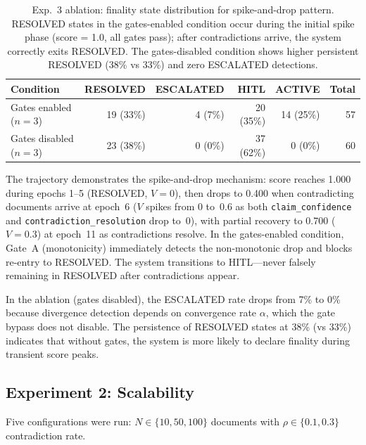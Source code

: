 \documentclass[11pt]{article}
\begin{document}
\begin{table}[H]
\centering
\small
\begin{tabular}{lrrrrr}
\toprule
\textbf{Condition} & \textbf{RESOLVED} & \textbf{ESCALATED} & \textbf{HITL} & \textbf{ACTIVE} & \textbf{Total} \\
\midrule
Gates enabled ($n = 3$)  & 19 (33\%) & 4 (7\%)  & 20 (35\%) & 14 (25\%) & 57 \\
Gates disabled ($n = 3$) & 23 (38\%) & 0 (0\%)  & 37 (62\%) & 0 (0\%)   & 60 \\
\bottomrule
\end{tabular}
\caption{Exp.~3 ablation: finality state distribution for spike-and-drop pattern. RESOLVED states in the gates-enabled condition occur during the initial spike phase (score = 1.0, all gates pass); after contradictions arrive, the system correctly exits RESOLVED. The gates-disabled condition shows higher persistent RESOLVED (38\% vs 33\%) and zero ESCALATED detections.}
\label{tab:exp3-ablation}
\end{table}

The trajectory demonstrates the spike-and-drop mechanism: score reaches 1.000 during epochs 1--5 (RESOLVED, $V = 0$), then drops to 0.400 when contradicting documents arrive at epoch~6 ($V$ spikes from 0 to~0.6 as both \texttt{claim\_confidence} and \texttt{contradiction\_resolution} drop to~0), with partial recovery to 0.700 ($V = 0.3$) at epoch~11 as contradictions resolve. In the gates-enabled condition, Gate~A (monotonicity) immediately detects the non-monotonic drop and blocks re-entry to RESOLVED. The system transitions to HITL---never falsely remaining in RESOLVED after contradictions appear.

In the ablation (gates disabled), the ESCALATED rate drops from 7\% to 0\% because divergence detection depends on convergence rate $\alpha$, which the gate bypass does not disable. The persistence of RESOLVED states at 38\% (vs 33\%) indicates that without gates, the system is more likely to declare finality during transient score peaks.

\subsection{Experiment 2: Scalability}

Five configurations were run: $N \in \{10, 50, 100\}$ documents with $\rho \in \{0.1, 0.3\}$ contradiction rate.
\end{document}
